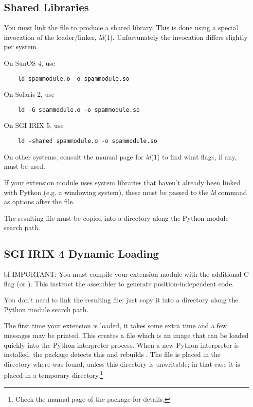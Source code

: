 \subsection{Shared Libraries}

You must link the  file to produce a shared library.  This is
done using a special invocation of the \UNIX{} loader/linker, {\em
ld}(1).  Unfortunately the invocation differs slightly per system.

On SunOS 4, use
\begin{verbatim}
    ld spammodule.o -o spammodule.so
\end{verbatim}

On Solaris 2, use
\begin{verbatim}
    ld -G spammodule.o -o spammodule.so
\end{verbatim}

On SGI IRIX 5, use
\begin{verbatim}
    ld -shared spammodule.o -o spammodule.so
\end{verbatim}

On other systems, consult the manual page for {\em ld}(1) to find what
flags, if any, must be used.

If your extension module uses system libraries that haven't already
been linked with Python (e.g. a windowing system), these must be
passed to the {\em ld} command as  options after the
 file.

The resulting file  must be copied into a directory
along the Python module search path.


\subsection{SGI IRIX 4 Dynamic Loading}

{bf IMPORTANT:} You must compile your extension module with the
additional C flag  (or ).  This instruct the
assembler to generate position-independent code.

You don't need to link the resulting  file; just
copy it into a directory along the Python module search path.

The first time your extension is loaded, it takes some extra time and
a few messages may be printed.  This creates a file
 which is an image that can be loaded quickly into
the Python interpreter process.  When a new Python interpreter is
installed, the  package detects this and rebuilds
.  The file  is placed in the
directory where  was found, unless this directory is
unwritable; in that case it is placed in a temporary
directory.\footnote{Check the manual page of the  package for
details.}

